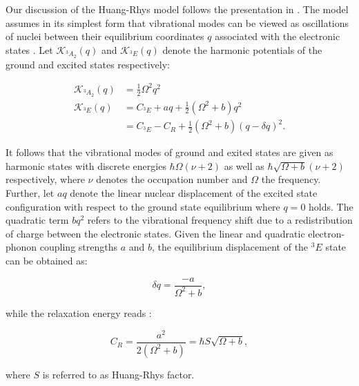     Our discussion of the Huang-Rhys model follows the presentation in \cite{Doherty2013}. The model assumes in its simplest form that vibrational modes can be viewed as oscillations of nuclei between their equilibrium coordinates $q$ associated with the electronic states \cite{Riedrich-moller2014}. Let $\mathcal{K}_{{}^{3}A_{2}}(q)$ and $\mathcal{K}_{{}^{3}E}(q)$ denote the harmonic potentials of the ground and excited states respectively:

    \begin{align}
      \mathcal{K}_{{}^{3}A_{2}}(q) & = \frac{1}{2} \Omega^2 q^2 \\
      \mathcal{K}_{{}^{3}E}(q) & = C_{{}^{3}E} + aq + \frac{1}{2} (\Omega^2 + b)q^2 \\
       & = C_{{}^{3}E} - C_R + \frac{1}{2} (\Omega^2 + b)(q - \delta q)^2.
    \end{align}

    It follows that the vibrational modes of ground and exited states are given as harmonic states with discrete energies $\hbar \Omega (\nu + 2)$ as well as $\hbar \sqrt{\Omega + b} (\nu + 2)$ respectively, where $\nu$ denotes the occupation number and $\Omega$ the frequency.
    Further, let $aq$ denote the linear nuclear displacement of the excited state configuration with respect to the ground state equilibrium where $q = 0$ holds.
    The quadratic term $bq^2$ refers to the vibrational frequency shift due to a redistribution of charge between the electronic states.
    Given the linear and quadratic electron-phonon coupling strengths $a$ and $b$, the equilibrium displacement of the ${}^{3}E$ state can be obtained as:

    \begin{equation}
      \delta q = \frac{-a}{\Omega^2 + b },
    \end{equation}

    while the relaxation energy reads \cite{Doherty2013}:

    \begin{equation}
      C_R = \frac{a^2}{2 (\Omega^2 + b)} = \hbar S \sqrt{\Omega + b},
    \end{equation}


   where $S$ is referred to as Huang-Rhys factor.

